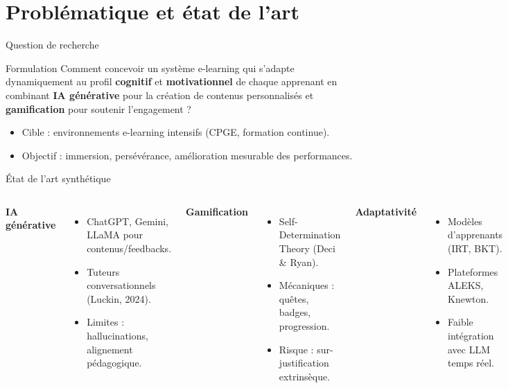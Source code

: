 \documentclass[aspectratio=169]{beamer}
\begin{document}
\section{Problématique et état de l'art}

\begin{frame}{Question de recherche}
  \begin{block}{Formulation}
    Comment concevoir un système e-learning qui s'adapte dynamiquement au profil \textbf{cognitif} et \textbf{motivationnel} de chaque apprenant en combinant \textbf{IA générative} pour la création de contenus personnalisés et \textbf{gamification} pour soutenir l'engagement ?
  \end{block}
  \begin{itemize}
    \item Cible : environnements e-learning intensifs (CPGE, formation continue).
    \item Objectif : immersion, persévérance, amélioration mesurable des performances.
  \end{itemize}
\end{frame}

\begin{frame}{État de l'art synthétique}
  \begin{columns}
    \textbf{IA générative}
    \begin{itemize}
      \item ChatGPT, Gemini, LLaMA pour contenus/feedbacks.
      \item Tuteurs conversationnels (Luckin, 2024).
      \item Limites : hallucinations, alignement pédagogique.
    \end{itemize}
    \textbf{Gamification}
    \begin{itemize}
      \item Self-Determination Theory (Deci \& Ryan).
      \item Mécaniques : quêtes, badges, progression.
      \item Risque : sur-justification extrinsèque.
    \end{itemize}
    \textbf{Adaptativité}
    \begin{itemize}
      \item Modèles d'apprenants (IRT, BKT).
      \item Plateformes ALEKS, Knewton.
      \item Faible intégration avec LLM temps réel.
    \end{itemize}
  \end{columns}
\end{frame}
\end{document}
